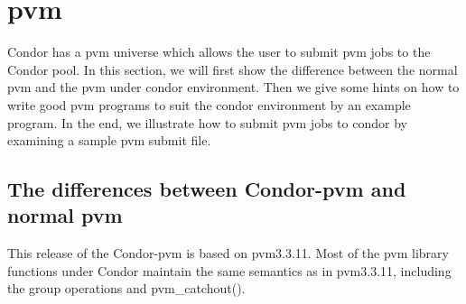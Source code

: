 




\section{pvm}

Condor has a pvm universe which allows the user to submit pvm jobs to
the Condor pool.  In this section, we will first
show the difference between the normal pvm and the pvm under condor
environment.  Then we give some hints on how to write good pvm
programs to suit the condor environment by an example program.  In the
end, we illustrate how to submit pvm jobs to condor by examining a
sample pvm submit file.

\subsection{The differences between Condor-pvm and normal pvm}

This release of the Condor-pvm is based on pvm3.3.11.  Most of the pvm
library functions under Condor maintain the same semantics as in
pvm3.3.11, including the group operations and pvm\_catchout().

